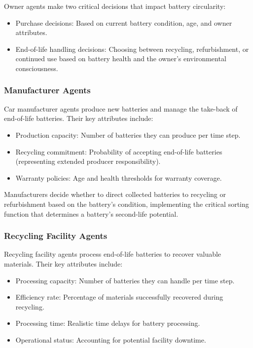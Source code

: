 Owner agents make two critical decisions that impact battery circularity:

\begin{itemize}
  \item Purchase decisions: Based on current battery condition, age, and owner attributes.
  \item End-of-life handling decisions: Choosing between recycling, refurbishment, or continued use based on battery health and the owner's environmental consciousness.
\end{itemize}

\subsubsection{Manufacturer Agents}
Car manufacturer agents produce new batteries and manage the take-back of end-of-life batteries. Their key attributes include:

\begin{itemize}
  \item Production capacity: Number of batteries they can produce per time step.
  \item Recycling commitment: Probability of accepting end-of-life batteries (representing extended producer responsibility).
  \item Warranty policies: Age and health thresholds for warranty coverage.
\end{itemize}

Manufacturers decide whether to direct collected batteries to recycling or refurbishment based on the battery's condition, implementing the critical sorting function that determines a battery's second-life potential.

\subsubsection{Recycling Facility Agents}
Recycling facility agents process end-of-life batteries to recover valuable materials. Their key attributes include:

\begin{itemize}
  \item Processing capacity: Number of batteries they can handle per time step.
  \item Efficiency rate: Percentage of materials successfully recovered during recycling.
  \item Processing time: Realistic time delays for battery processing.
  \item Operational status: Accounting for potential facility downtime.
\end{itemize}

